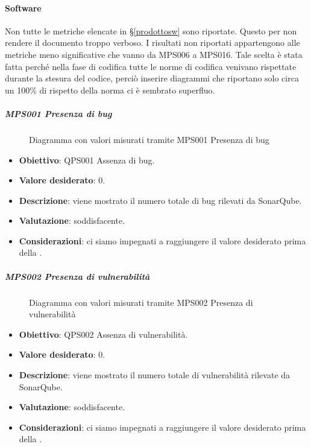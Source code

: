 	\paragraph{Software}
    Non tutte le metriche elencate in \S\ref{prodottosw} sono riportate. Questo per non rendere il documento troppo verboso. I risultati non riportati appartengono alle metriche meno significative che vanno da MPS006 a MPS016. Tale scelta è stata fatta perché nella fase di codifica tutte le norme di codifica venivano rispettate durante la stesura del codice, perciò inserire diagrammi che riportano solo circa un 100\% di rispetto della norma ci è sembrato superfluo.
	
	\subparagraph{MPS001 Presenza di bug}
	
	\begin{figure}[H]
		\centering
		\label{immaginePresenzaBugRQ}
		\caption{Diagramma con valori misurati tramite MPS001 Presenza di bug}
	\end{figure}
	
	\begin{itemize}
		\item \textbf{Obiettivo}: QPS001 Assenza di bug.
		\item \textbf{Valore desiderato}: 0.
		\item \textbf{Descrizione}: viene mostrato il numero totale di bug rilevati da SonarQube.
		\item \textbf{Valutazione}: soddisfacente.
		\item \textbf{Considerazioni}: ci siamo impegnati a raggiungere il valore desiderato prima della \RQ.
	\end{itemize}
	
	\subparagraph{MPS002 Presenza di vulnerabilità}
	
	\begin{figure}[H]
		\centering
		\label{immaginePresenzaVulnerabilitàRQ}
		\caption{Diagramma con valori misurati tramite MPS002 Presenza di vulnerabilità}
	\end{figure}
	
	\begin{itemize}
		\item \textbf{Obiettivo}: QPS002 Assenza di vulnerabilità.
		\item \textbf{Valore desiderato}: 0.
		\item \textbf{Descrizione}: viene mostrato il numero totale di vulnerabilità rilevate da SonarQube.
		\item \textbf{Valutazione}: soddisfacente.
		\item \textbf{Considerazioni}: ci siamo impegnati a raggiungere il valore desiderato prima della \RQ.
	\end{itemize}
	
